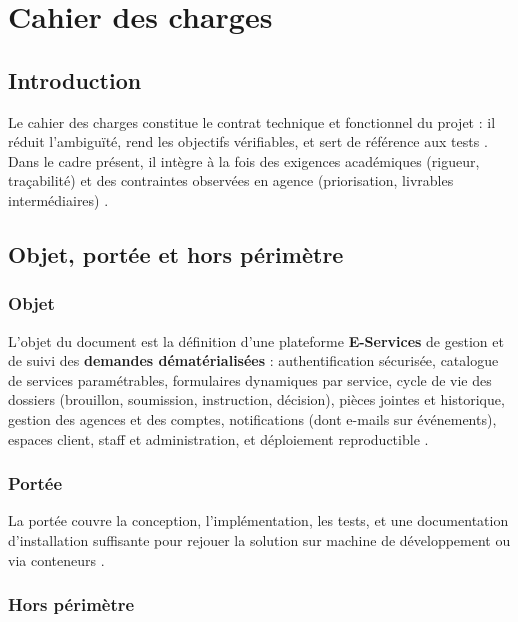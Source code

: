 \chapter{Cahier des charges}
\label{chap:cdc}

\section{Introduction}

Le cahier des charges constitue le contrat technique et fonctionnel du projet : il réduit l'ambiguïté, rend les objectifs vérifiables, et sert de référence aux tests \cite{sommerville2016,ieee1012}. Dans le cadre présent, il intègre à la fois des exigences académiques (rigueur, traçabilité) et des contraintes observées en agence (priorisation, livrables intermédiaires) \cite{pressman2014}.

\section{Objet, portée et hors périmètre}

\subsection{Objet}

L'objet du document est la définition d'une plateforme \textbf{E-Services} de gestion et de suivi des \textbf{demandes dématérialisées} : authentification sécurisée, catalogue de services paramétrables, formulaires dynamiques par service, cycle de vie des dossiers (brouillon, soumission, instruction, décision), pièces jointes et historique, gestion des agences et des comptes, notifications (dont e-mails sur événements), espaces client, staff et administration, et déploiement reproductible \cite{rfc7231,dockerdoc}.

\subsection{Portée}

La portée couvre la conception, l'implémentation, les tests, et une documentation d'installation suffisante pour rejouer la solution sur machine de développement ou via conteneurs \cite{twelvefactor}.

\subsection{Hors périmètre}

